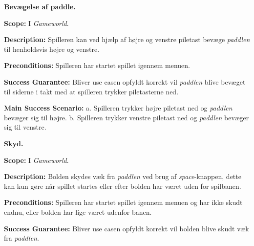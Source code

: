 \textbf{Bevægelse af paddle.}\newline

\textbf{Scope:}\newline
I \textit{Gameworld}.\newline

\textbf{Description:} \newline
Spilleren kan ved hjælp af højre og venstre piletast bevæge \textit{paddlen} til henholdsvis højre og venstre.\newline

\textbf{Preconditions:}\newline
Spilleren har startet spillet igennem menuen.\newline

\textbf{Success Guarantee:}\newline
Bliver use casen opfyldt korrekt vil \textit{paddlen} blive bevæget til siderne i takt med at spilleren trykker piletasterne ned.\newline

\textbf{Main Success Scenario:}\newline
 a. Spilleren trykker højre piletast ned og \textit{paddlen} bevæger sig til højre.\newline
 b. Spilleren trykker venstre piletast ned og \textit{paddlen} bevæger sig til venstre.\newline \newline


\textbf{Skyd.}\newline

\textbf{Scope:}\newline
I \textit{Gameworld}.\newline

\textbf{Description:} \newline
Bolden skydes væk fra \textit{paddlen} ved brug af \textit{space}-knappen, dette kan kun gøre når spillet startes eller efter bolden har været uden for spilbanen. \newline

\textbf{Preconditions:}\newline
Spilleren har startet spillet igennem menuen og har ikke skudt endnu, eller bolden har lige været udenfor banen.\newline

\textbf{Success Guarantee:}\newline
Bliver use casen opfyldt korrekt vil bolden blive skudt væk fra \textit{paddlen}.\newline

